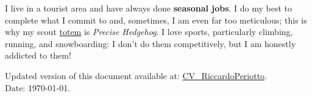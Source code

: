 \documentclass[11 pt,oneside,a4paper,titlepage]{article}
\begin{document}
{\begin{minipage}{11.3cm}
        I live in a tourist area and have always done \textbf{seasonal jobs}. I do my best to complete what I commit to and, sometimes, I am even far too meticulous; this is why my scout \href{https://it.wikipedia.org/wiki/Totem_(nome_scout)}{totem} is \textit{Precise Hedgehog}. I love sports, particularly climbing, running, and snowboarding: I don't do them competitively, but I am honestly addicted to them!      

        \vspace*{0.18cm}
        Updated version of this document available at: \href{https://riccardoperiotto.github.io/CV_RiccardoPeriotto.pdf}{CV\_RiccardoPeriotto}. \\
        Date: \today.
    \end{minipage}} %
\end{document}
